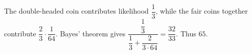 The double-headed coin contributes likelihood $\dfrac{1}{3}$, while the fair coins together contribute $\dfrac{2}{3}\cdot\dfrac{1}{64}$. Bayes' theorem gives $\dfrac{\dfrac{1}{3}}{\dfrac{1}{3}+\dfrac{2}{3\cdot64}}=\dfrac{32}{33}$. Thus $\boxed{65}$.
